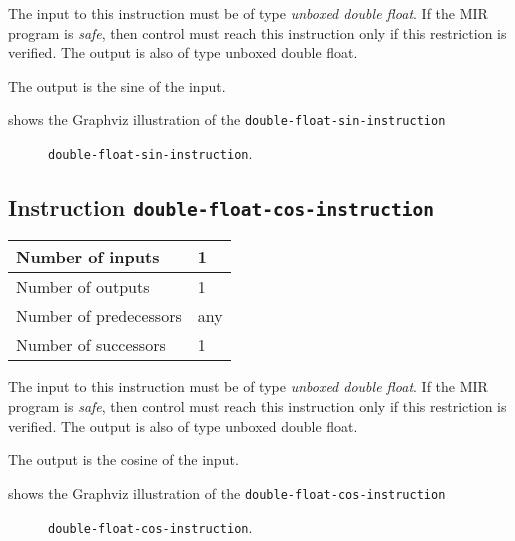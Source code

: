 The input to this instruction must be of type \emph{unboxed double
  float}.  If the MIR program is \emph{safe}, then control must reach
this instruction only if this restriction is verified.  The output is
also of type unboxed double float.

The output is the sine of the input.

 shows the Graphviz illustration of the
\texttt{double-float-sin-instruction}

\begin{figure}
\begin{center}
\end{center}
\caption{\label{fig-double-float-sin-instruction}
\texttt{double-float-sin-instruction}.}
\end{figure}

\subsection{Instruction \texttt{double-float-cos-instruction}}
\label{mir-instruction-double-float-div}

\begin{tabular}{|l|l|}
\hline
Number of inputs & 1\\
\hline
Number of outputs & 1\\
\hline
Number of predecessors & any\\
\hline
Number of successors & 1\\
\hline
\end{tabular}

The input to this instruction must be of type \emph{unboxed double
  float}.  If the MIR program is \emph{safe}, then control must reach
this instruction only if this restriction is verified.  The output is
also of type unboxed double float.

The output is the cosine of the input.

 shows the Graphviz illustration of the
\texttt{double-float-cos-instruction}

\begin{figure}
\begin{center}
\end{center}
\caption{\label{fig-double-float-cos-instruction}
\texttt{double-float-cos-instruction}.}
\end{figure}

